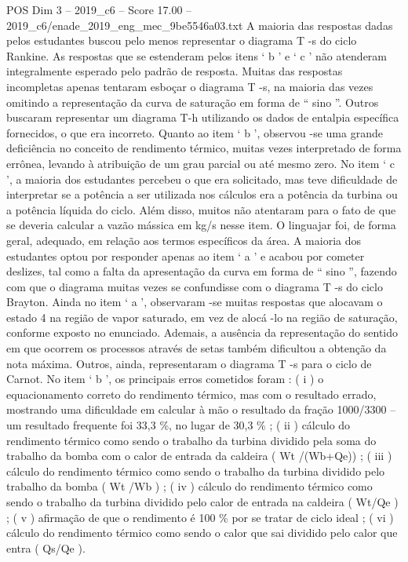 \begin{textsample}{POS Dim 3 – 2019\_c6 – Score 17.00 – 2019\_c6/enade\_2019\_eng\_mec\_9be5546a03.txt}
A maioria das respostas dadas pelos estudantes buscou pelo menos representar o diagrama T -s do ciclo Rankine.
As respostas que se estenderam pelos itens ‘ b ’ e ‘ c ’ não atenderam integralmente esperado pelo padrão de resposta.
Muitas das respostas incompletas apenas tentaram esboçar o diagrama T -s, na maioria das vezes omitindo a representação da curva de saturação em forma de “ sino ”.
Outros buscaram representar um diagrama T-h utilizando os dados de entalpia específica fornecidos, o que era incorreto.
Quanto ao item ‘ b ’, observou -se uma grande deficiência no conceito de rendimento térmico, muitas vezes interpretado de forma errônea, levando à atribuição de um grau parcial ou até mesmo zero.
No item ‘ c ’, a maioria dos estudantes percebeu o que era solicitado, mas teve dificuldade de interpretar se a potência a ser utilizada nos cálculos era a potência da turbina ou a potência líquida do ciclo.
Além disso, muitos não atentaram para o fato de que se deveria calcular a vazão mássica em kg/s nesse item.
O linguajar foi, de forma geral, adequado, em relação aos termos específicos da área.
A maioria dos estudantes optou por responder apenas ao item ‘ a ’ e acabou por cometer deslizes, tal como a falta da apresentação da curva em forma de “ sino ”, fazendo com que o diagrama muitas vezes se confundisse com o diagrama T -s do ciclo Brayton.
Ainda no item ‘ a ’, observaram -se muitas respostas que alocavam o estado 4 na região de vapor saturado, em vez de alocá -lo na região de saturação, conforme exposto no enunciado.
Ademais, a ausência da representação do sentido em que ocorrem os processos através de setas também dificultou a obtenção da nota máxima.
Outros, ainda, representaram o diagrama T -s para o ciclo de Carnot.
No item ‘ b ’, os principais erros cometidos foram : ( i ) o equacionamento correto do rendimento térmico, mas com o resultado errado, mostrando uma dificuldade em calcular à mão o resultado da fração 1000/3300 – um resultado frequente foi 33,3 \%, no lugar de 30,3 \% ; ( ii ) cálculo do rendimento térmico como sendo o trabalho da turbina dividido pela soma do trabalho da bomba com o calor de entrada da caldeira ( Wt /(Wb+Qe)) ; ( iii ) cálculo do rendimento térmico como sendo o trabalho da turbina dividido pelo trabalho da bomba ( Wt /Wb ) ; ( iv ) cálculo do rendimento térmico como sendo o trabalho da turbina dividido pelo calor de entrada na caldeira ( Wt/Qe ) ; ( v ) afirmação de que o rendimento é 100 \% por se tratar de ciclo ideal ; ( vi ) cálculo do rendimento térmico como sendo o calor que sai dividido pelo calor que entra ( Qs/Qe ).

\end{textsample}
